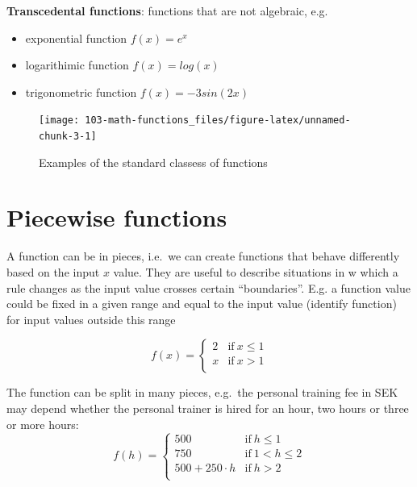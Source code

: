 \documentclass[
]{book}
\providecommand{\tightlist}{%
  \setlength{\itemsep}{0pt}\setlength{\parskip}{0pt}}
\theoremstyle{definition}
\theoremstyle{definition}
\theoremstyle{definition}
\theoremstyle{remark}
\begin{document}
\textbf{Transcedental functions}: functions that are not algebraic, e.g.~

\begin{itemize}
\tightlist
\item
  exponential function \(f(x) = e^x\)
\item
  logarithimic function \(f(x) = log(x)\)
\item
  trigonometric function \(f(x) = -3sin(2x)\)
\end{itemize}

\begin{figure}

{\centering \texttt{[image: 103-math-functions\_files/figure-latex/unnamed-chunk-3-1]} 

}

\caption{Examples of the standard classess of functions}\label{fig:unnamed-chunk-3}
\end{figure}

\hypertarget{piecewise-functions}{%
\section{Piecewise functions}\label{piecewise-functions}}

A function can be in pieces, i.e.~we can create functions that behave differently based on the input \(x\) value. They are useful to describe situations in w which a rule changes as the input value crosses certain ``boundaries''. E.g. a function value could be fixed in a given range and equal to the input value (identify function) for input values outside this range

\begin{equation}
    f(x) =
    \left\{
        \begin{array}{cc}
                2 & \mathrm{if\ } x \le 1 \\
                x & \mathrm{if\ } x>1 \\
        \end{array}
    \right.
\end{equation}

The function can be split in many pieces, e.g.~the personal training fee in SEK may depend whether the personal trainer is hired for an hour, two hours or three or more hours:
\begin{equation}
    f(h) =
    \left\{
        \begin{array}{cc}
                500  & \mathrm{if\ } h \le 1 \\
                750  & \mathrm{if\ } 1 < h \le 2 \\
                500 + 250 \cdot h & \mathrm{if\ } h > 2 \\
        \end{array}
    \right.
\end{equation}
\end{document}
